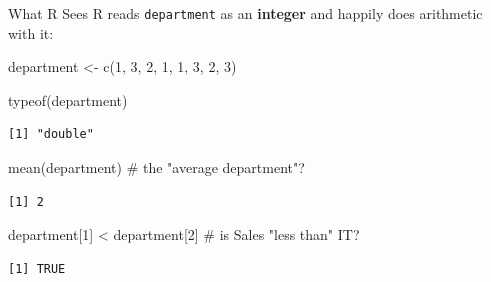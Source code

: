 \documentclass[
  ignorenonframetext,
  aspectratio=169,
]{beamer}
\newenvironment{Shaded}{\begin{snugshade}}{\end{snugshade}}
\newcommand{\CommentTok}[1]{\textcolor[rgb]{0.37,0.37,0.37}{#1}}
\newcommand{\DecValTok}[1]{\textcolor[rgb]{0.68,0.00,0.00}{#1}}
\newcommand{\FunctionTok}[1]{\textcolor[rgb]{0.28,0.35,0.67}{#1}}
\newcommand{\NormalTok}[1]{\textcolor[rgb]{0.00,0.23,0.31}{#1}}
\newcommand{\OtherTok}[1]{\textcolor[rgb]{0.00,0.23,0.31}{#1}}
\newcommand{\SpecialCharTok}[1]{\textcolor[rgb]{0.37,0.37,0.37}{#1}}
\begin{document}
\begin{frame}[fragile]{What R Sees}
\protect\hypertarget{what-r-sees}{}
R reads \texttt{department} as an \textbf{integer} and happily does
arithmetic with it:

\begin{Shaded}
\begin{Highlighting}[]
\NormalTok{department }\OtherTok{\textless{}{-}} \FunctionTok{c}\NormalTok{(}\DecValTok{1}\NormalTok{, }\DecValTok{3}\NormalTok{, }\DecValTok{2}\NormalTok{, }\DecValTok{1}\NormalTok{, }\DecValTok{1}\NormalTok{, }\DecValTok{3}\NormalTok{, }\DecValTok{2}\NormalTok{, }\DecValTok{3}\NormalTok{)}

\FunctionTok{typeof}\NormalTok{(department)}
\end{Highlighting}
\end{Shaded}

\begingroup\tiny\color{darkgray}

\begin{verbatim}
[1] "double"
\end{verbatim}

\endgroup

\begin{Shaded}
\begin{Highlighting}[]
\FunctionTok{mean}\NormalTok{(department)                }\CommentTok{\# the "average department"?}
\end{Highlighting}
\end{Shaded}

\begingroup\tiny\color{darkgray}

\begin{verbatim}
[1] 2
\end{verbatim}

\endgroup

\begin{Shaded}
\begin{Highlighting}[]
\NormalTok{department[}\DecValTok{1}\NormalTok{] }\SpecialCharTok{\textless{}}\NormalTok{ department[}\DecValTok{2}\NormalTok{]   }\CommentTok{\# is Sales "less than" IT?}
\end{Highlighting}
\end{Shaded}

\begingroup\tiny\color{darkgray}

\begin{verbatim}
[1] TRUE
\end{verbatim}

\endgroup
\end{frame}
\end{document}
